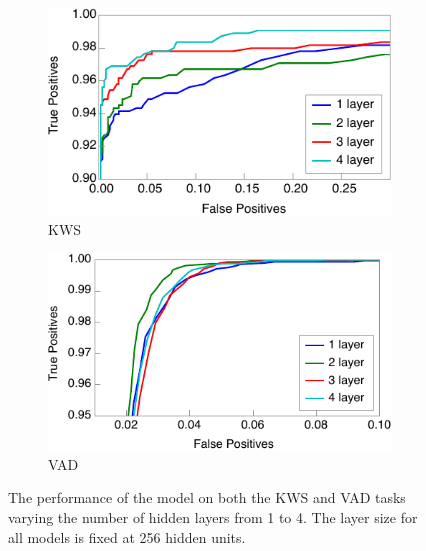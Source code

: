 \begin{figure}
\centering
\begin{subfigure}{0.47\textwidth}
    \includegraphics[width=\textwidth]{kws/figures/layers.pdf}
    \caption{KWS}
\end{subfigure}
\hfill
\begin{subfigure}{0.47\textwidth}
    \includegraphics[width=\textwidth]{kws/figures/layers_vad.pdf}
    \caption{VAD}
\end{subfigure}
\caption{The performance of the model on both the KWS and VAD
         tasks varying the number of hidden layers from 1 to 4. The layer size for
         all models is fixed at 256 hidden units.}
\label{fig:kws:layers} 
\end{figure}

